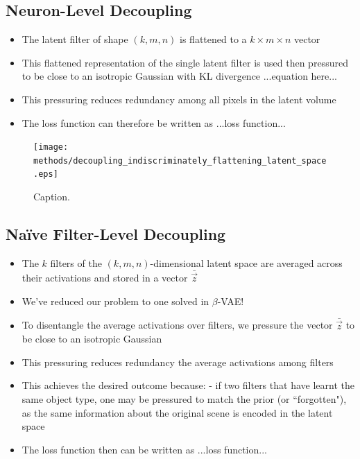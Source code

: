 %
%
\subsection{Neuron-Level Decoupling}
\begin{itemize}
\item The latent filter of shape $(k, m, n)$ is flattened to a $k \times m \times n$ vector
\item This flattened representation of the single latent filter is used then pressured to be close to an isotropic Gaussian with KL divergence ...equation here...
\item This pressuring reduces redundancy among all pixels in the latent volume
\item The loss function can therefore be written as ...loss function...
\end{itemize}

\begin{figure}[H]
\centering
\captionsetup{justification=centering}
\texttt{[image: methods/decoupling\_indiscriminately\_flattening\_latent\_space.eps]}
\caption{Caption.}
\label{fig:decoupling_indiscriminately_flattening_latent_space}
\end{figure}

%
%
\subsection{Na{\"i}ve Filter-Level Decoupling}
\begin{itemize}
\item The $k$ filters of the $(k, m, n)$-dimensional latent space are averaged across their activations and stored in a vector $\bar{\vec{z}}$
\item We've reduced our problem to one solved in $\beta$-VAE!
\item To disentangle the average activations over filters, we pressure the vector $\bar{\vec{z}}$ to be close to an isotropic Gaussian
\item This pressuring reduces redundancy the average activations among filters
\item This achieves the desired outcome because: - if two filters that have learnt the same object type, one may be pressured to match the prior (or ``forgotten"), as the same information about the original scene is encoded in the latent space
\item The loss function then can be written as ...loss function...
\end{itemize}

